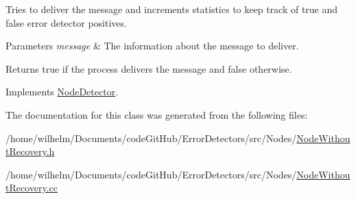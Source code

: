 Tries to deliver the message and increments statistics to keep track of true and false error detector positives. 


\begin{DoxyParams}{Parameters}
{\em message} & The information about the message to deliver. \\
\hline
\end{DoxyParams}
\begin{DoxyReturn}{Returns}
true if the process delivers the message and false otherwise. 
\end{DoxyReturn}


Implements \hyperlink{class_node_detector_a51e7dccd54e94bbe937752ca39dfdba4}{Node\+Detector}.



The documentation for this class was generated from the following files\+:\begin{DoxyCompactItemize}
\item 
/home/wilhelm/\+Documents/code\+Git\+Hub/\+Error\+Detectors/src/\+Nodes/\hyperlink{_node_without_recovery_8h}{Node\+Without\+Recovery.\+h}\item 
/home/wilhelm/\+Documents/code\+Git\+Hub/\+Error\+Detectors/src/\+Nodes/\hyperlink{_node_without_recovery_8cc}{Node\+Without\+Recovery.\+cc}\end{DoxyCompactItemize}
